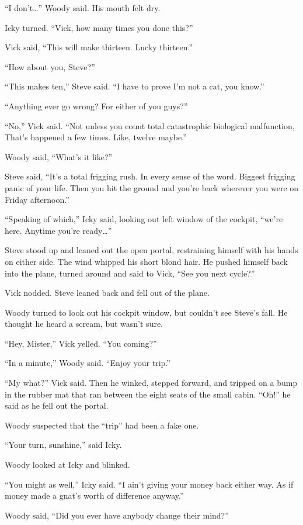 “I don’t…” Woody said. His mouth felt dry.

Icky turned. “Vick, how many times you done this?”

Vick said, “This will make thirteen. Lucky thirteen.”

“How about you, Steve?”

“This makes ten,” Steve said. “I have to prove I’m not a cat, you know.”

“Anything ever go wrong? For either of you guys?”

“No,” Vick said. “Not unless you count total catastrophic biological malfunction, That’s happened a few times. Like, twelve maybe.”

Woody said, “What’s it like?”

Steve said, “It’s a total frigging rush. In every sense of the word. Biggest frigging panic of your life. Then you hit the ground and you’re back wherever you were on Friday afternoon.”

“Speaking of which,” Icky said, looking out left window of the cockpit, “we’re here. Anytime you’re ready…”

Steve stood up and leaned out the open portal, restraining himself with his hands on either side. The wind whipped his short blond hair. He pushed himself back into the plane, turned around and said to Vick, “See you next cycle?”

Vick nodded. Steve leaned back and fell out of the plane.

Woody turned to look out his cockpit window, but couldn’t see Steve’s fall. He thought he heard a scream, but wasn’t sure.

“Hey, Mister,” Vick yelled. “You coming?”

“In a minute,” Woody said. “Enjoy your trip.”

“My what?” Vick said. Then he winked, stepped forward, and tripped on a bump in the rubber mat that ran between the eight seats of the small cabin. “Oh!” he said as he fell out the portal.

Woody suspected that the “trip” had been a fake one.

“Your turn, sunshine,” said Icky.

Woody looked at Icky and blinked.

“You might as well,” Icky said. “I ain’t giving your money back either way. As if money made a gnat’s worth of difference anyway.”

Woody said, “Did you ever have anybody change their mind?”

